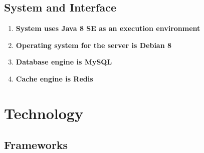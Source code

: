 	\subsection{System and Interface}
	
		\begin{enumerate}
			\item \textbf{System uses Java 8 SE as an execution environment} \\
			
			\item \textbf{Operating system for the server is Debian 8} \\
			
			\item \textbf{Database engine is MySQL} \\
			
			\item \textbf{Cache engine is Redis} \\
		\end{enumerate}
	
\section{Technology}

	\subsection{Frameworks}
	